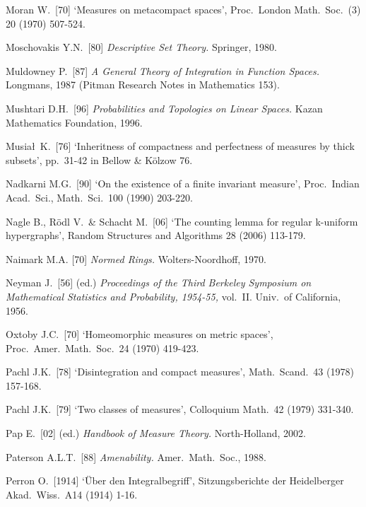 {Moran W.\ [70] `Measures on metacompact spaces', Proc.\ London Math.\
Soc.\ (3) 20 (1970) 507-524.
\cmmnt{[438J.]}

Moschovakis Y.N.\ [80] {\it Descriptive Set Theory.}   Springer, 1980.
\cmmnt{[Chap.\ 42 {\it intro.}, \S423 {\it notes\/}.]}

Muldowney P.\ [87] {\it A General Theory of Integration in Function
Spaces.}   Longmans, 1987 (Pitman Research Notes in Mathematics 153).
\cmmnt{[481P, \S482 {\it notes\/}.]}

Mushtari D.H.\ [96] {\it Probabilities and Topologies on Linear Spaces.}
Kazan Mathematics Foundation, 1996.

Musia\l\ K.\ [76] `Inheritness of compactness and perfectness of
measures by thick subsets',  pp.\ 31-42 in {\smc Bellow \& K\"olzow 76}.
\cmmnt{[451U.]}

\medskip%

Nadkarni M.G.\ [90] `On the existence of a finite invariant measure',
Proc.\ Indian Acad.\ Sci., Math.\ Sci.\ 100 (1990) 203-220.
\cmmnt{[448P, \S448 {\it notes\/}.]}

Nagle B., R\"odl V.\ \& Schacht M.\ [06]
`The counting lemma for regular k-uniform hypergraphs',
Random Structures and Algorithms 28 (2006) 113-179.
\cmmnt{[497J.]}

Naimark M.A. [70] {\it Normed Rings.}  Wolters-Noordhoff, 1970.
\cmmnt{[\S441 {\it notes\/}.]}

Neyman J.\ [56] (ed.) {\it Proceedings of the Third Berkeley Symposium
on Mathematical Statistics and Probability, 1954-55,} vol.\ II.   Univ.\
of California, 1956.

\medskip%
Oxtoby J.C.\ [70] `Homeomorphic measures on metric spaces', 
Proc.\ Amer.\ Math.\ Soc.\ 24 (1970) 419-423. 
\cmmnt{[434Yp.]} 

\medskip%

Pachl J.K.\ [78] `Disintegration and compact measures', Math.\ Scand.\
43 (1978) 157-168.
\cmmnt{[452I, 452S, 452Ye, \S452 {\it notes\/}.]}

Pachl J.K.\ [79] `Two classes of measures', Colloquium Math.\ 42 (1979)
331-340.
\cmmnt{[452R.]}

Pap E.\ [02] (ed.) {\it Handbook of Measure Theory.}  North-Holland, 2002.

Paterson A.L.T.\ [88] {\it Amenability.}   Amer.\ Math.\ Soc., 1988.
\cmmnt{[449K, \S449 {\it notes\/}.]}

Perron O.\ [1914] `\"Uber den Integralbegriff', Sitzungsberichte der
Heidelberger Akad.\ Wiss.\ A14 (1914) 1-16.

}
